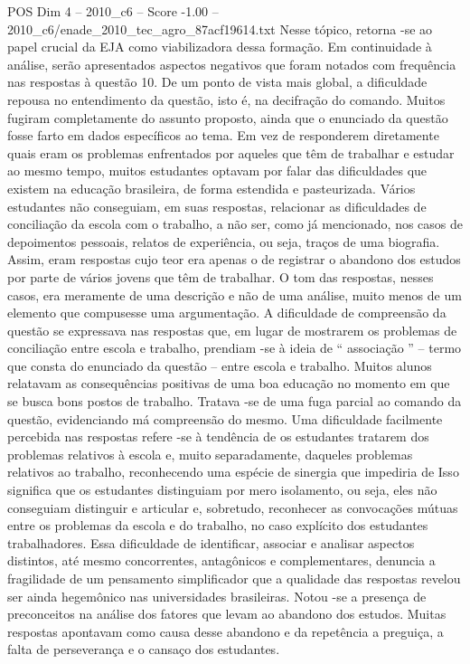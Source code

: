 \begin{textsample}{POS Dim 4 – 2010\_c6 – Score -1.00 – 2010\_c6/enade\_2010\_tec\_agro\_87acf19614.txt}
Nesse tópico, retorna -se ao papel crucial da EJA como viabilizadora dessa formação.
Em continuidade à análise, serão apresentados aspectos negativos que foram notados com frequência nas respostas à questão 10.
De um ponto de vista mais global, a dificuldade repousa no entendimento da questão, isto é, na decifração do comando.
Muitos fugiram completamente do assunto proposto, ainda que o enunciado da questão fosse farto em dados específicos ao tema.
Em vez de responderem diretamente quais eram os problemas enfrentados por aqueles que têm de trabalhar e estudar ao mesmo tempo, muitos estudantes optavam por falar das dificuldades que existem na educação brasileira, de forma estendida e pasteurizada.
Vários estudantes não conseguiam, em suas respostas, relacionar as dificuldades de conciliação da escola com o trabalho, a não ser, como já mencionado, nos casos de depoimentos pessoais, relatos de experiência, ou seja, traços de uma biografia.
Assim, eram respostas cujo teor era apenas o de registrar o abandono dos estudos por parte de vários jovens que têm de trabalhar.
O tom das respostas, nesses casos, era meramente de uma descrição e não de uma análise, muito menos de um elemento que compusesse uma argumentação.
A dificuldade de compreensão da questão se expressava nas respostas que, em lugar de mostrarem os problemas de conciliação entre escola e trabalho, prendiam -se à ideia de “ associação ” – termo que consta do enunciado da questão – entre escola e trabalho.
Muitos alunos relatavam as consequências positivas de uma boa educação no momento em que se busca bons postos de trabalho.
Tratava -se de uma fuga parcial ao comando da questão, evidenciando má compreensão do mesmo.
Uma dificuldade facilmente percebida nas respostas refere -se à tendência de os estudantes tratarem dos problemas relativos à escola e, muito separadamente, daqueles problemas relativos ao trabalho, reconhecendo uma espécie de sinergia que impediria de Isso significa que os estudantes distinguiam por mero isolamento, ou seja, eles não conseguiam distinguir e articular e, sobretudo, reconhecer as convocações mútuas entre os problemas da escola e do trabalho, no caso explícito dos estudantes trabalhadores.
Essa dificuldade de identificar, associar e analisar aspectos distintos, até mesmo concorrentes, antagônicos e complementares, denuncia a fragilidade de um pensamento simplificador que a qualidade das respostas revelou ser ainda hegemônico nas universidades brasileiras.
Notou -se a presença de preconceitos na análise dos fatores que levam ao abandono dos estudos.
Muitas respostas apontavam como causa desse abandono e da repetência a preguiça, a falta de perseverança e o cansaço dos estudantes.

\end{textsample}
